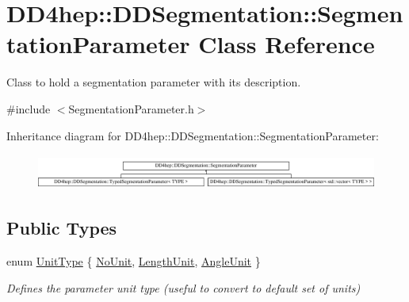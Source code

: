 \hypertarget{class_d_d4hep_1_1_d_d_segmentation_1_1_segmentation_parameter}{}\section{D\+D4hep\+:\+:D\+D\+Segmentation\+:\+:Segmentation\+Parameter Class Reference}
\label{class_d_d4hep_1_1_d_d_segmentation_1_1_segmentation_parameter}


Class to hold a segmentation parameter with its description.  




{\ttfamily \#include $<$Segmentation\+Parameter.\+h$>$}

Inheritance diagram for D\+D4hep\+:\+:D\+D\+Segmentation\+:\+:Segmentation\+Parameter\+:\begin{figure}[H]
\begin{center}
\leavevmode
\includegraphics[height=1.174004cm]{class_d_d4hep_1_1_d_d_segmentation_1_1_segmentation_parameter}
\end{center}
\end{figure}
\subsection*{Public Types}
\begin{DoxyCompactItemize}
\item 
enum \hyperlink{class_d_d4hep_1_1_d_d_segmentation_1_1_segmentation_parameter_a36f5f8b8d812b2a2b81363377565d8d4}{Unit\+Type} \{ \hyperlink{class_d_d4hep_1_1_d_d_segmentation_1_1_segmentation_parameter_a36f5f8b8d812b2a2b81363377565d8d4ab217a538e0ac077135786260a2221c14}{No\+Unit}, 
\hyperlink{class_d_d4hep_1_1_d_d_segmentation_1_1_segmentation_parameter_a36f5f8b8d812b2a2b81363377565d8d4abc6abab85badff20f421ca8a5abd5554}{Length\+Unit}, 
\hyperlink{class_d_d4hep_1_1_d_d_segmentation_1_1_segmentation_parameter_a36f5f8b8d812b2a2b81363377565d8d4ae1d90430aa09c467095657e0ba8b8d0f}{Angle\+Unit}
 \}\begin{DoxyCompactList}\small\item\em Defines the parameter unit type (useful to convert to default set of units) \end{DoxyCompactList}
\end{DoxyCompactItemize}
